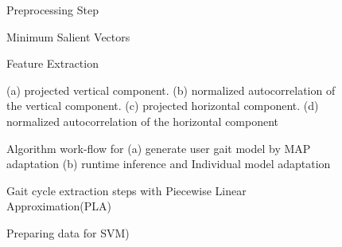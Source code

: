 \documentclass{sig-alternate}
\begin{document}

\begin{figure}
\centering
{}
\caption{Preprocessing Step}
\label{fig:firstStep}
\end{figure}

\begin{figure*}
\centering
{}
\caption{Minimum Salient Vectors}
\label{fig:AccelChart}
\end{figure*}

\begin{figure}
\centering
{}
\caption{Feature Extraction}
\label{fig:SecondStep}
\end{figure}

\begin{figure}
\centering
{}
\caption{(a) projected vertical component. (b) normalized autocorrelation of the vertical component. (c) projected horizontal component. (d) normalized autocorrelation of the horizontal component}
\label{fig:TD1}
\end{figure}

\begin{figure}
\centering
{}
\caption{Algorithm work-flow for (a) generate user gait model by MAP adaptation (b) runtime inference and Individual model adaptation}
\label{fig:TD2}
\end{figure}

\begin{figure}
\centering
{}
\caption{Gait cycle extraction steps with Piecewise Linear Approximation(PLA)}
\label{fig:AddedStep}
\end{figure}

\begin{figure}
\centering
{}
\caption{Preparing data for SVM)}
\label{fig:TrainingData}
\end{figure}
\end{document}
